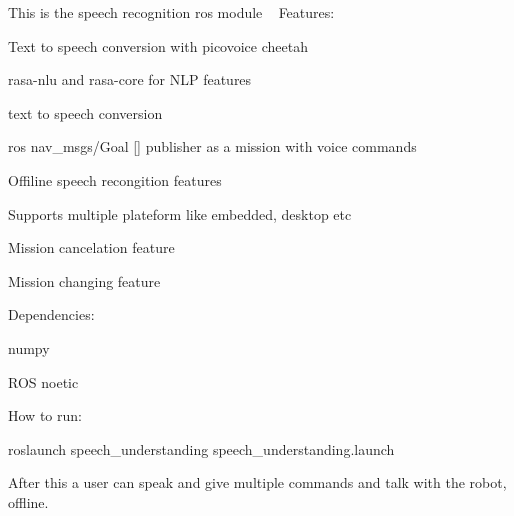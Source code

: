 This is the speech recognition ros module ~\newline
 Features\+: ~\newline

\begin{DoxyEnumerate}
\item Text to speech conversion with picovoice cheetah ~\newline

\item rasa-\/nlu and rasa-\/core for N\+LP features ~\newline

\item text to speech conversion ~\newline

\item ros nav\+\_\+msgs/\+Goal \mbox{[}\mbox{]} publisher as a mission with voice commands ~\newline

\item Offiline speech recongition features
\item Supports multiple plateform like embedded, desktop etc ~\newline

\item Mission cancelation feature ~\newline

\item Mission changing feature ~\newline

\end{DoxyEnumerate}

Dependencies\+: ~\newline

\begin{DoxyEnumerate}
\item numpy ~\newline

\item R\+OS noetic ~\newline

\end{DoxyEnumerate}

How to run\+: ~\newline

\begin{DoxyEnumerate}
\item roslaunch speech\+\_\+understanding speech\+\_\+understanding.\+launch ~\newline

\end{DoxyEnumerate}

After this a user can speak and give multiple commands and talk with the robot, offline. 